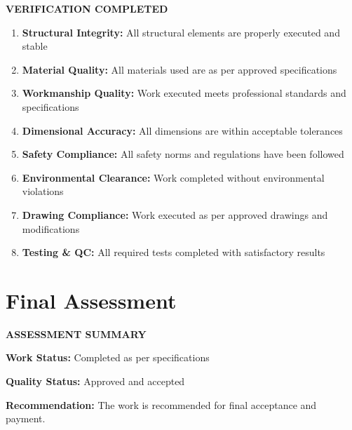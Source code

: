 \documentclass[12pt,a4paper]{article}
\newcommand{\checkbox}{\makebox[1em]{$\boxtimes$}}
\begin{document}
\begin{center}
{\begin{minipage}{0.95\textwidth}
\begin{center}
\colorbox{approvedgreen!20}{\begin{minipage}{0.9\textwidth}
\textbf{\textcolor{approvedgreen}{VERIFICATION COMPLETED}}

\vspace{0.5cm}
\begin{enumerate}[leftmargin=1cm]
\item \checkbox \textbf{Structural Integrity:} All structural elements are properly executed and stable

\item \checkbox \textbf{Material Quality:} All materials used are as per approved specifications

\item \checkbox \textbf{Workmanship Quality:} Work executed meets professional standards and specifications

\item \checkbox \textbf{Dimensional Accuracy:} All dimensions are within acceptable tolerances

\item \checkbox \textbf{Safety Compliance:} All safety norms and regulations have been followed

\item \checkbox \textbf{Environmental Clearance:} Work completed without environmental violations

\item \checkbox \textbf{Drawing Compliance:} Work executed as per approved drawings and modifications

\item \checkbox \textbf{Testing \& QC:} All required tests completed with satisfactory results
\end{enumerate}
\end{minipage}}
\end{center}

\vspace{1cm}
\section*{Final Assessment}

\begin{center}
\colorbox{certgold!20}{\begin{minipage}{0.8\textwidth}
\begin{center}
\textbf{\textcolor{certblue}{ASSESSMENT SUMMARY}}
\end{center}

\vspace{0.3cm}
\textbf{Work Status:} Completed as per specifications

\textbf{Quality Status:} Approved and accepted

\textbf{Recommendation:} The work is recommended for final acceptance and payment.
\end{minipage}}
\end{center}

\vspace{1cm}
\end{minipage}}
\end{center}
\end{document}
